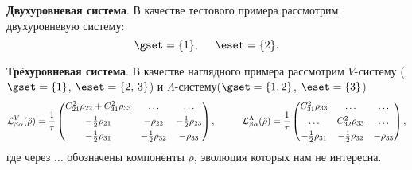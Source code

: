 \textbf{Двухуровневая система}.  В качестве тестового примера рассмотрим двухуровневую систему:
\begin{equation*}
    \gset = \{1\}, \hspace{5 mm} \eset = \{2\}.
\end{equation*}





\textbf{Трёхуровневая система}. В качестве наглядного примера рассмотрим $V$-систему ($\gset = \{1\}$, $\eset = \{2,\,  3\}$) и $\Lambda$-систему($\gset = \{1, 2\}$, $\eset = \{3\}$)
\begin{equation*}
    {\mathcal L}^V_{\beta \alpha} (\hat{\rho}) = \frac{1}{\tau}\begin{pmatrix}
        C_{21}^2 \rho_{22} + C_{31}^2 \rho_{33} & \ldots & \ldots \\[4pt]
        - \tfrac{1}{2} \rho_{21} & - \rho_{22} & - \tfrac{1}{2}\rho_{23} \\[4pt]
        -\tfrac{1}{2} \rho_{31} & -\tfrac{1}{2} \rho_{32} & -\rho_{33} \\
    \end{pmatrix}, \hspace{10 mm} 
    {\mathcal L}^\Lambda_{\beta \alpha} (\hat{\rho}) = \frac{1}{\tau}
    \begin{pmatrix}
        C_{31}^2 \rho_{33} & \ldots & \ldots \\[4pt]
        \ldots & C_{32}^2 \rho_{33} & \ldots \\[4pt]
        - \tfrac{1}{2} \rho_{31} & -\tfrac{1}{2} \rho_{32} & - \rho_{33} \\
    \end{pmatrix},
\end{equation*}
где через $\ldots$ обозначены компоненты $\rho$, эволюция которых нам не интересна.